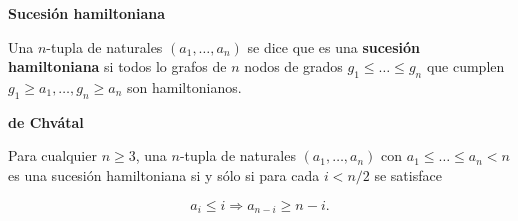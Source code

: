 \documentclass[openany]{book}
\begin{document}
\begin{definition}{ \color{turquoise} \textbf{Sucesión hamiltoniana}}

  Una $n$-tupla de naturales $\left(a_{1}, \ldots, a_{n}\right)$ se dice que es una \textbf{sucesión hamiltoniana} si todos lo grafos de $n$ nodos de grados $g_{1} \leq \ldots \leq g_{n}$ que cumplen $g_{1} \geq a_{1}, \ldots, g_{n} \geq a_{n}$ son hamiltonianos.
\end{definition}

\begin{theorem}{ \color{turquoise} \textbf{de Chvátal}}

  Para cualquier $n \geq 3$, una $n$-tupla de naturales $\left(a_{1}, \ldots, a_{n}\right)$ con $a_{1} \leq \ldots \leq a_{n}<n$ es una sucesión hamiltoniana si y sólo si para cada $i<n / 2$ se satisface

  $$
  a_{i} \leq i \Rightarrow a_{n-i} \geq n-i .
  $$

\end{theorem}
\end{document}
